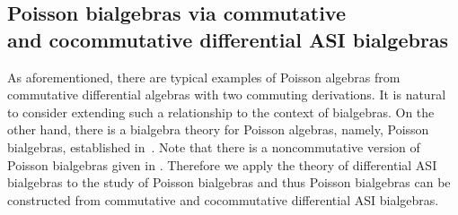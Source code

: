 \documentclass[10pt,a4paper]{amsart}
\numberwithin{equation}{section}
\begin{document}
\subsection[Poisson bialgebras via commutative and cocommutative differential ASI bialgebras]{Poisson bialgebras via commutative\\ and cocommutative differential ASI bialgebras}

As aforementioned, there are typical examples of Poisson algebras
from commutative differential algebras with two commuting
derivations. It is natural to consider extending such a
relationship to the context of bialgebras. On the other hand,
there is a bialgebra theory for Poisson algebras, namely, Poisson
bialgebras, established in~\cite{ni2013poisson}. Note that there
is a noncommutative version of Poisson bialgebras given in
\cite{liu2020noncommutative}. Therefore we apply the theory of
differential ASI bialgebras to the study of Poisson bialgebras and
thus Poisson bialgebras can be constructed from commutative and
cocommutative differential ASI bialgebras.
\end{document}
